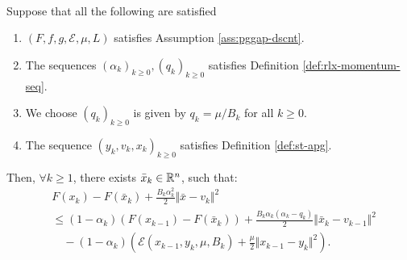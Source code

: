 \documentclass[12pt]{article}
\begin{document}
        \begin{lemma}\;\label{lemma:cnvg-prep-part3}\\
            Suppose that all the following are satisfied
            \begin{enumerate}[nosep]
                \item $(F, f, g, \mathcal E, \mu, L)$ satisfies Assumption \ref{ass:pggap-dscnt}. 
                \item The sequences $(\alpha_k)_{k \ge 0}, (q_k)_{k \ge 0}$ satisfies Definition \ref{def:rlx-momentum-seq}. 
                \item We choose $(q_k)_{k \ge 0}$ is given by $q_k = \mu/B_k$ for all $k \ge 0$. 
                \item The sequence $(y_k, v_k, x_k)_{k \ge 0}$ satisfies Definition \ref{def:st-apg}. 
            \end{enumerate}
            Then, $\forall k \ge 1$, there exists $\bar x_k \in \mathbb R^n$, such that: 
            \begin{align*}
                & F(x_k) - F(\bar x_k)
                + \frac{B_k\alpha_k^2}{2}\Vert \bar x - v_k\Vert^2 
                \\
                &\le 
                (1 - \alpha_k)(F(x_{k - 1}) - F(\bar x_k))
                + \frac{B_k\alpha_k(\alpha_k - q_k)}{2}\Vert \bar x_k - v_{k - 1}\Vert^2
                \\ &\quad 
                    -(1 - \alpha_k)\left(
                        \mathcal E(x_{k - 1}, y_k, \mu, B_k)
                        + \frac{\mu}{2}\Vert x_{k - 1} - y_k\Vert^2
                    \right). 
            \end{align*}
        \end{lemma}
\end{document}
